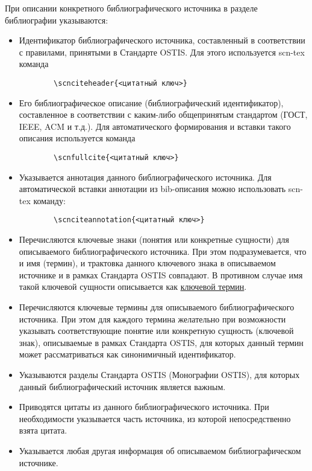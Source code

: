 При описании конкретного библиографического источника в разделе библиографии указываются:

\begin{itemize}
	\item Идентификатор библиографического источника, составленный в соответствии с правилами, принятыми в Стандарте OSTIS. Для этого используется scn-tex команда 
	\begin{verbatim}
		\scnciteheader{<цитатный ключ>}
	\end{verbatim}
	\item Его библиографическое описание (библиографический идентификатор), составленное в соответствии с каким-либо общепринятым стандартом (ГОСТ, IEEE, ACM и т.д.). Для автоматического формирования и вставки такого описания используется команда
	\begin{verbatim}
		\scnfullcite{<цитатный ключ>}
	\end{verbatim}
	\item Указывается аннотация данного библиографического источника. Для автоматической вставки аннотации из bib-описания можно использовать scn-tex команду:
	\begin{verbatim}
		\scnciteannotation{<цитатный ключ>}
	\end{verbatim}
	\item Перечисляются ключевые знаки (понятия или конкретные сущности) для описываемого библиографического источника. При этом подразумевается, что и имя (термин), и трактовка данного ключевого знака в описываемом источнике и в рамках Стандарта OSTIS совпадают. В противном случае имя такой ключевой сущности описывается как \uline{ключевой термин}.
	\item Перечисляются ключевые термины для описываемого библиографического источника. При этом для каждого термина желательно при возможности указывать соответствующие понятие или конкретную сущность (ключевой знак), описываемые в рамках Стандарта OSTIS, для которых данный термин может рассматриваться как синонимичный идентификатор.
	\item Указываются разделы Стандарта OSTIS (Монографии OSTIS), для которых данный библиографический источник является важным.
	\item Приводятся цитаты из данного библиографического источника. При необходимости указывается часть источника, из которой непосредственно взята цитата.
	\item Указывается любая другая информация об описываемом библиографическом источнике.
\end{itemize}

